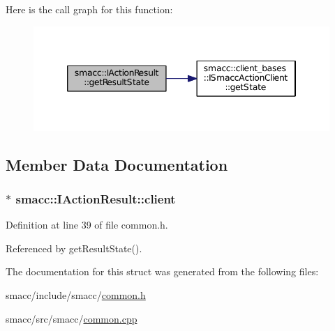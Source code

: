 Here is the call graph for this function\+:
\nopagebreak
\begin{figure}[H]
\begin{center}
\leavevmode
\includegraphics[width=346pt]{structsmacc_1_1IActionResult_af33869a3b1711af070597b8fe605ce70_cgraph}
\end{center}
\end{figure}




\subsection{Member Data Documentation}
\subsubsection[{\texorpdfstring{client}{client}}]{$\ast$ smacc\+::\+I\+Action\+Result\+::client}\hypertarget{structsmacc_1_1IActionResult_a7eb7b7d8680b62f468e1172099af0552}{}\label{structsmacc_1_1IActionResult_a7eb7b7d8680b62f468e1172099af0552}


Definition at line 39 of file common.\+h.



Referenced by get\+Result\+State().



The documentation for this struct was generated from the following files\+:\begin{DoxyCompactItemize}
\item 
smacc/include/smacc/\hyperlink{common_8h}{common.\+h}\item 
smacc/src/smacc/\hyperlink{common_8cpp}{common.\+cpp}\end{DoxyCompactItemize}
